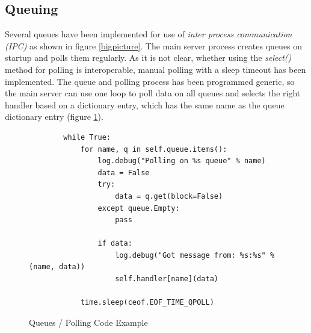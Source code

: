\subsection{Queuing}
Several queues have been implemented for use of 
\textit{inter process communication (IPC)} as shown in figure \ref{bigpicture}.
The main server process creates queues on startup and polls them regularly.
As it is not clear, whether using the \textit{select()} method
for polling is interoperable, manual polling with a sleep timeout has been 
implemented. The queue and polling process
has been programmed generic, so the main server can use one loop
to poll data on all queues and selects the right handler based on
a dictionary entry, which has the same name as the queue dictionary
entry (figure \ref{queuepoll}).
\begin{figure}[htbp]
\caption{Queues / Polling Code Example}
\label{queuepoll}
\begin{verbatim}
        while True:
            for name, q in self.queue.items():
                log.debug("Polling on %s queue" % name)
                data = False
                try:
                    data = q.get(block=False)
                except queue.Empty:
                    pass

                if data:
                    log.debug("Got message from: %s:%s" % (name, data))
                    self.handler[name](data)

            time.sleep(ceof.EOF_TIME_QPOLL)
\end{verbatim}
\end{figure}
